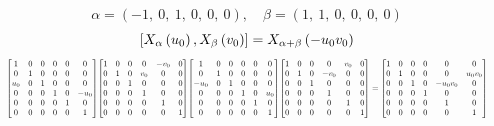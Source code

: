 \documentclass[11pt]{article}
\theoremstyle{definition}
\begin{document}
\[
\alpha = \left( -1, \  0, \  1, \  0, \  0, \  0\right), \quad \beta = \left( 1, \  1, \  0, \  0, \  0, \  0\right)
\]
\[
\scaletoalign{\textwidth}{\left[ X_{\alpha}\left(u_{0}\right), X_{\beta}\left(v_{0}\right) \right] = X_{\alpha + \beta}\left(- u_{0} v_{0}\right)}
\]
\[
\scaletoalign{\textwidth}{{\left[\begin{matrix}1 & 0 & 0 & 0 & 0 & 0\\0 & 1 & 0 & 0 & 0 & 0\\u_{0} & 0 & 1 & 0 & 0 & 0\\0 & 0 & 0 & 1 & 0 & - u_{0}\\0 & 0 & 0 & 0 & 1 & 0\\0 & 0 & 0 & 0 & 0 & 1\end{matrix}\right]} {\left[\begin{matrix}1 & 0 & 0 & 0 & - v_{0} & 0\\0 & 1 & 0 & v_{0} & 0 & 0\\0 & 0 & 1 & 0 & 0 & 0\\0 & 0 & 0 & 1 & 0 & 0\\0 & 0 & 0 & 0 & 1 & 0\\0 & 0 & 0 & 0 & 0 & 1\end{matrix}\right]} {\left[\begin{matrix}1 & 0 & 0 & 0 & 0 & 0\\0 & 1 & 0 & 0 & 0 & 0\\- u_{0} & 0 & 1 & 0 & 0 & 0\\0 & 0 & 0 & 1 & 0 & u_{0}\\0 & 0 & 0 & 0 & 1 & 0\\0 & 0 & 0 & 0 & 0 & 1\end{matrix}\right]} {\left[\begin{matrix}1 & 0 & 0 & 0 & v_{0} & 0\\0 & 1 & 0 & - v_{0} & 0 & 0\\0 & 0 & 1 & 0 & 0 & 0\\0 & 0 & 0 & 1 & 0 & 0\\0 & 0 & 0 & 0 & 1 & 0\\0 & 0 & 0 & 0 & 0 & 1\end{matrix}\right]} = {\left[\begin{matrix}1 & 0 & 0 & 0 & 0 & 0\\0 & 1 & 0 & 0 & 0 & u_{0} v_{0}\\0 & 0 & 1 & 0 & - u_{0} v_{0} & 0\\0 & 0 & 0 & 1 & 0 & 0\\0 & 0 & 0 & 0 & 1 & 0\\0 & 0 & 0 & 0 & 0 & 1\end{matrix}\right]}}
\]
\end{document}

